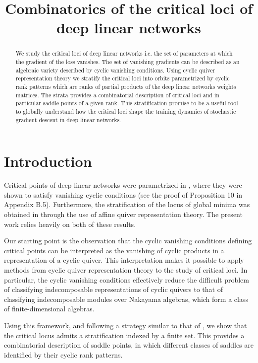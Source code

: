 \documentclass{article}
\title{Combinatorics of the critical loci of deep linear networks}
\theoremstyle{definition}
\begin{document}
\maketitle
\begin{abstract}
    We study the critical loci of deep linear networks i.e. the set of parameters at which the gradient of the loss vanishes. The set of vanishing gradients can be described as an algebraic variety described by cyclic vanishing conditions. Using cyclic quiver representation theory we stratify the critical loci into orbits parametrized by cyclic rank patterns which are ranks of partial products of the deep linear networks weights matrices. The strata provides a combinatorial description of critical loci and in particular saddle points of a given rank. This stratification promise to be a useful tool to globally understand how the critical loci shape the training dynamics of stochastic gradient descent in deep linear networks.  
\end{abstract}
\section{Introduction}
Critical points of deep linear networks were parametrized in \cite{achour2024loss}, where they were shown to satisfy vanishing cyclic conditions (see the proof of Proposition 10 in Appendix B.5). Furthermore, the stratification of the locus of global minima was obtained in \cite{lehalleur2024geometry} through the use of affine quiver representation theory. The present work relies heavily on both of these results.

Our starting point is the observation that the cyclic vanishing conditions defining critical points can be interpreted as the vanishing of cyclic products in a representation of a cyclic quiver. This interpretation makes it possible to apply methods from cyclic quiver representation theory to the study of critical loci. In particular, the cyclic vanishing conditions effectively reduce the difficult problem of classifying indecomposable representations of cyclic quivers to that of classifying indecomposable modules over Nakayama algebras, which form a class of finite-dimensional algebras.

Using this framework, and following a strategy similar to that of \cite{lehalleur2024geometry}, we show that the critical locus admits a stratification indexed by a finite set. This provides a combinatorial description of saddle points, in which different classes of saddles are identified by their cyclic rank patterns.
\end{document}
